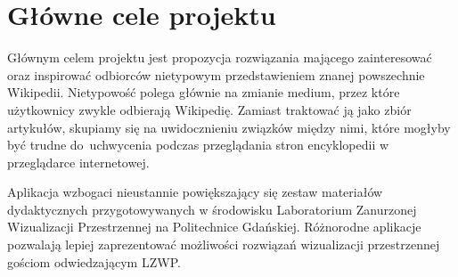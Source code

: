 \section{Główne cele projektu}
Głównym celem projektu jest propozycja rozwiązania mającego zainteresować oraz inspirować odbiorców nietypowym przedstawieniem znanej powszechnie Wikipedii. Nietypowość polega głównie na zmianie medium, przez które użytkownicy zwykle odbierają Wikipedię. Zamiast traktować ją jako zbiór artykułów, skupiamy się na uwidocznieniu związków między nimi, które mogłyby być trudne do~uchwycenia podczas przeglądania stron encyklopedii w przeglądarce internetowej.

Aplikacja wzbogaci nieustannie powiększający się zestaw materiałów dydaktycznych przygotowywanych w środowisku Laboratorium Zanurzonej Wizualizacji Przestrzennej na Politechnice Gdańskiej. Różnorodne aplikacje pozwalają lepiej zaprezentować możliwości rozwiązań wizualizacji przestrzennej gościom odwiedzającym LZWP.